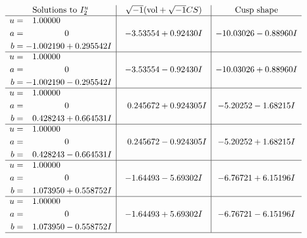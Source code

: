 \documentclass[1p]{elsarticle_modified}
\theoremstyle{definition}
\newcommand{\I}{\sqrt{-1}}
\begin{document}
$$\begin{array}{c|c|c}  
\text{Solutions to }I^u_{2}& \I (\text{vol} + \sqrt{-1}CS) & \text{Cusp shape}\\
 \hline 
\begin{aligned}
u &= \phantom{-}1.00000\phantom{ +0.000000I} \\
a &= \phantom{-0.000000 } 0 \\
b &= -1.002190 + 0.295542 I\end{aligned}
 & -3.53554 + 0.92430 I & -10.03026 - 0.88960 I \\ \hline\begin{aligned}
u &= \phantom{-}1.00000\phantom{ +0.000000I} \\
a &= \phantom{-0.000000 } 0 \\
b &= -1.002190 - 0.295542 I\end{aligned}
 & -3.53554 - 0.92430 I & -10.03026 + 0.88960 I \\ \hline\begin{aligned}
u &= \phantom{-}1.00000\phantom{ +0.000000I} \\
a &= \phantom{-0.000000 } 0 \\
b &= \phantom{-}0.428243 + 0.664531 I\end{aligned}
 & \phantom{-}0.245672 + 0.924305 I & -5.20252 - 1.68215 I \\ \hline\begin{aligned}
u &= \phantom{-}1.00000\phantom{ +0.000000I} \\
a &= \phantom{-0.000000 } 0 \\
b &= \phantom{-}0.428243 - 0.664531 I\end{aligned}
 & \phantom{-}0.245672 - 0.924305 I & -5.20252 + 1.68215 I \\ \hline\begin{aligned}
u &= \phantom{-}1.00000\phantom{ +0.000000I} \\
a &= \phantom{-0.000000 } 0 \\
b &= \phantom{-}1.073950 + 0.558752 I\end{aligned}
 & -1.64493 - 5.69302 I & -6.76721 + 6.15196 I \\ \hline\begin{aligned}
u &= \phantom{-}1.00000\phantom{ +0.000000I} \\
a &= \phantom{-0.000000 } 0 \\
b &= \phantom{-}1.073950 - 0.558752 I\end{aligned}
 & -1.64493 + 5.69302 I & -6.76721 - 6.15196 I\\
 \hline 
 \end{array}$$\newpage
\end{document}

